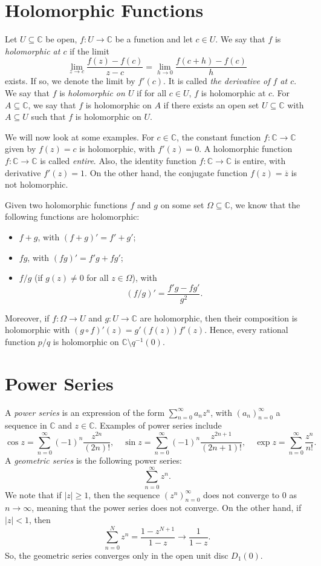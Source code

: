 \documentclass[a4paper, openany]{memoir}
\theoremstyle{definition}
\theoremstyle{plain}
\begin{document}
    \section{Holomorphic Functions}
    Let $U \subseteq \mathbb{C}$ be open, $f \colon U \to \mathbb{C}$ be a function and let $c \in U$. We say that $f$ is \emph{holomorphic at $c$} if the limit
    \[\lim_{z \to c} \frac{f(z) - f(c)}{z - c}= \lim_{h \to 0} \frac{f(c + h) - f(c)}{h}\]
    exists. If so, we denote the limit by $f'(c)$. It is called \emph{the derivative of $f$ at $c$}. We say that $f$ is \emph{holomorphic on $U$} if for all $c \in U$, $f$ is holomorphic at $c$. For $A \subseteq \mathbb{C}$, we say that $f$ is holomorphic on $A$ if there exists an open set $U \subseteq \mathbb{C}$ with $A \subseteq U$ such that $f$ is holomorphic on $U$.

    We will now look at some examples. For $c \in \mathbb{C}$, the constant function $f \colon \mathbb{C} \to \mathbb{C}$ given by $f(z) = c$ is holomorphic, with $f'(z) = 0$. A holomorphic function $f \colon \mathbb{C} \to \mathbb{C}$ is called \emph{entire}. Also, the identity function $f \colon \mathbb{C} \to \mathbb{C}$ is entire, with derivative $f'(z) = 1$. On the other hand, the conjugate function $f(z) = \overline{z}$ is not holomorphic. 
    
    Given two holomorphic functions $f$ and $g$ on some set $\Omega \subseteq \mathbb{C}$, we know that the following functions are holomorphic:
    \begin{itemize}
        \item $f + g$, with $(f + g)' = f' + g'$;
        \item $fg$, with $(fg)' = f'g + fg'$;
        \item $f/g$ (if $g(z) \neq 0$ for all $z \in \Omega$), with 
        \[(f/g)' = \frac{f'g - fg'}{g^2}.\]
    \end{itemize}
    Moreover, if $f \colon \Omega \to U$ and $g \colon U \to \mathbb{C}$ are holomorphic, then their composition is holomorphic with $(g \circ f)'(z) = g'(f(z)) f'(z)$. Hence, every rational function $p/q$ is holomorphic on $\mathbb{C} \setminus q^{-1}(0)$.
    \newpage

    \section{Power Series}
    A \emph{power series} is an expression of the form $\sum_{n=0}^\infty a_n z^n$, with $(a_n)_{n=0}^\infty$ a sequence in $\mathbb{C}$ and $z \in \mathbb{C}$. Examples of power series include
    \[\cos z = \sum_{n=0}^\infty (-1)^n \frac{z^{2n}}{(2n)!}, \quad \sin z = \sum_{n=0}^\infty (-1)^n \frac{z^{2n+1}}{(2n+1)!}, \quad \exp z = \sum_{n=0}^\infty \frac{z^n}{n!}.\]
    A \emph{geometric series} is the following power series:
    \[\sum_{n=0}^\infty z^n.\]
    We note that if $|z| \geq 1$, then the sequence $(z^n)_{n=0}^\infty$ does not converge to $0$ as $n \to \infty$, meaning that the power series does not converge. On the other hand, if $|z| < 1$, then
    \[\sum_{n=0}^N z^n = \frac{1 - z^{N+1}}{1 - z} \to \frac{1}{1 - z}.\]
    So, the geometric series converges only in the open unit disc $D_1(0)$. 
    
\end{document}
